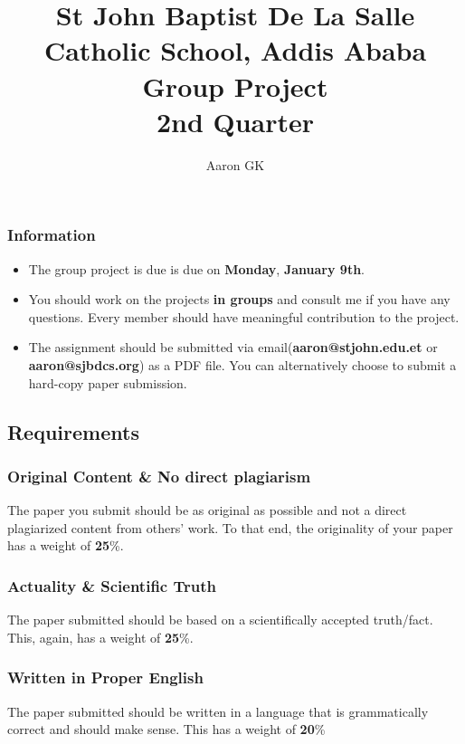 \documentclass[9pt,addpoints]{exam}
\author{Aaron GK}
\begin{document}
	\title{St John Baptist De La Salle Catholic School, Addis Ababa\\
		\large Group Project \\
		2nd Quarter}
	\maketitle
	\begin{center}
		\subsubsection*{Information}
		\begin{itemize}
			\item The group project is due is due on \textbf{Monday}, \textbf{January 9th}.
			\item You should work on the projects \textbf{in groups} and consult me if you have any questions. Every member should have meaningful contribution to the project.
			\item The assignment should be submitted via email(\textbf{aaron@stjohn.edu.et} or \textbf{aaron@sjbdcs.org}) as a PDF file. You can alternatively choose to submit a hard-copy paper submission.
		\end{itemize}
	\end{center}
	\begin{center}
		\subsection*{Requirements}
	\end{center}
	\subsubsection*{Original Content \& No direct plagiarism } 
	The paper you submit should be as original as possible and not a direct plagiarized content from others' work. To that end, the originality of your paper has a weight of \textbf{25}\%.
	\subsubsection*{Actuality \& Scientific Truth}
	The paper submitted should be based on a scientifically accepted truth/fact. This, again, has a weight of \textbf{25}\%.
	\subsubsection*{Written in Proper English}
	The paper submitted should be written in a language that is grammatically correct and should make sense. This has a weight of \textbf{20}\%
\end{document}
